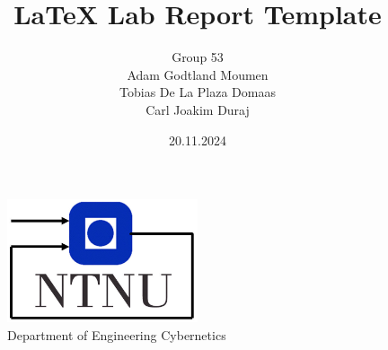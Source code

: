 \documentclass[11pt, a4paper, USenglish]{article} %
\begin{document}
\title{LaTeX Lab Report Template}
\author{Group 53\\Adam Godtland Moumen\\Tobias De La Plaza Domaas\\Carl Joakim Duraj}
\date{20.11.2024}
\begin{titlepage}
    \maketitle
    \begin{figure}
    \centering
    \includegraphics[width=0.5\textwidth]{figures/itk_ntnu}\\
    Department of Engineering Cybernetics
    \end{figure}
    \thispagestyle{empty}
\end{titlepage}

\newpage
    
\thispagestyle{empty} %

\newpage
\tableofcontents
\thispagestyle{empty} %

\newpage
\setcounter{page}{1}






\newpage
{}
\printbibliography{}
\label{sec:bibliography}
\end{document}
